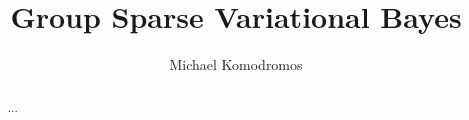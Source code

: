 \documentclass[12pt]{article}
\title{Group Sparse Variational Bayes}
\author{Michael Komodromos}
\begin{document}
\maketitle


\begin{abstract}
    ...
\end{abstract}

\newpage
\tableofcontents





% 
% 
% 


\newpage



\end{document}
